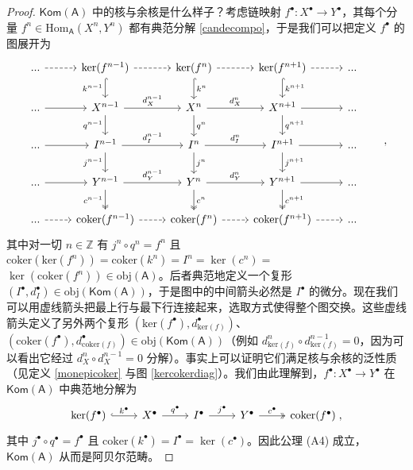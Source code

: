 \begin{proof}
	$\mathsf{Kom(A)}$ 中的核与余核是什么样子？考虑链映射 $f^\bullet:X^\bullet\rightarrow Y^\bullet$，其每个分量 $f^n\in\text{Hom}_\mathsf{A}(X^n,Y^n)$ 都有典范分解 \eqref{candecompo}，于是我们可以把定义 $f^\bullet$ 的图展开为
	\[
	\begin{tikzcd}
		...\arrow[r, dashed] & \text{ker}(f^{n-1})\arrow[r, dashed]\arrow[d, hook, "k^{n-1}"'] & \text{ker}(f^{n})\arrow[r, dashed]\arrow[d, hook, "k^{n}"] & \text{ker}(f^{n+1})\arrow[r, dashed]\arrow[d, hook, "k^{n+1}"] & ... \\
		...\arrow[r] & X^{n-1}\arrow[r, "d_X^{n-1}"]\arrow[d, "q^{n-1}"'] & X^{n}\arrow[r, "d_X^{n}"]\arrow[d, "q^{n}"] & X^{n+1}\arrow[r]\arrow[d, "q^{n+1}"] & ... \\
		...\arrow[r] & I^{n-1}\arrow[r, "d_I^{n-1}"]\arrow[d, "j^{n-1}"'] & I^{n}\arrow[r, "d_I^{n}"]\arrow[d, "j^{n}"] & I^{n+1}\arrow[r]\arrow[d, "j^{n+1}"] & ... \\
		...\arrow[r] & Y^{n-1}\arrow[r, "d_Y^{n-1}"]\arrow[d, two heads, "c^{n-1}"'] & Y^{n}\arrow[r, "d_Y^{n}"]\arrow[d, two heads, "c^{n}"] & Y^{n+1}\arrow[r]\arrow[d, two heads, "c^{n+1}"] & ... \\
		...\arrow[r, dashed] & \text{coker}(f^{n-1})\arrow[r, dashed] & \text{coker}(f^{n})\arrow[r, dashed] & \text{coker}(f^{n+1})\arrow[r, dashed] & ...
	\end{tikzcd}\qquad,
	\]
	其中对一切 $n\in\mathbb{Z}$ 有 $j^n\circ q^n=f^n$ 且 $\text{coker}(\text{ker}(f^n))=\text{coker}(k^n)=I^n=\ker(c^n)=$\break $\ker(\text{coker}(f^n))\in\text{obj}(\mathsf{A})$。后者典范地定义一个复形 $(I^\bullet, d_I^\bullet)\in\text{obj}(\mathsf{Kom(A)})$，于是图中的中间箭头必然是 $I^\bullet$ 的微分。现在我们可以用虚线箭头把最上行与最下行连接起来，选取方式使得整个图交换。这些虚线箭头定义了另外两个复形 $(\text{ker}(f^\bullet), d_{\text{ker}(f)}^\bullet)$、$(\text{coker}(f^\bullet), d_{\text{coker}(f)}^\bullet)\in\text{obj}(\mathsf{Kom(A)})$（例如 $d_{\text{ker}(f)}^n\circ d_{\text{ker}(f)}^{n-1}=0$，因为可以看出它经过 $d_X^n\circ d_X^{n-1}=0$ 分解）。事实上可以证明它们满足核与余核的泛性质（见定义 \ref{monepicoker} 与图 \eqref{kercokerdiag}）。我们由此理解到，$f^\bullet:X^\bullet\rightarrow Y^\bullet$ 在 $\mathsf{Kom(A)}$ 中典范地分解为
	\begin{equation*}
		\begin{tikzcd}
			\ker(f^\bullet)\arrow[r, hook, "k^\bullet"] & X^\bullet\arrow[r, "q^\bullet"] & I^\bullet\arrow[r, "j^\bullet"] & Y^\bullet\arrow[r, two heads, "c^\bullet"] & \text{coker}(f^\bullet)\;,
		\end{tikzcd}
	\end{equation*}
	其中 $j^\bullet\circ q^\bullet = f^\bullet$ 且 $\text{coker}(k^\bullet)=I^\bullet=\ker(c^\bullet)$。因此公理 (A4) 成立，$\mathsf{Kom(A)}$ 从而是阿贝尔范畴。
\end{proof}

